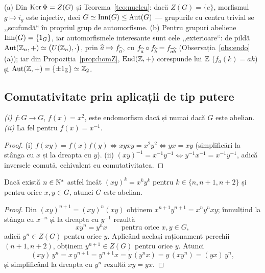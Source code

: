 \begin{observatie}
(a) Din $\operatorname{Ker}\Phi=Z(G)$ și Teorema~\ref{teo:nucleu}: dacă $Z(G)=\{e\}$, morfismul $g\mapsto i_g$ este injectiv, deci $G\simeq\operatorname{Inn}(G)\le\operatorname{Aut}(G)$ --- grupurile cu centru trivial se ,,scufundă`` în propriul grup de automorfisme. (b) Pentru grupuri abeliene $\operatorname{Inn}(G)=\{1_G\}$, iar automorfismele interesante sunt cele ,,exterioare``: de pildă $\operatorname{Aut}(\mathbb{Z}_n,+)\simeq\bigl(U(\mathbb{Z}_n),\cdot\bigr)$, prin $\widehat{a}\mapsto f_{\widehat{a}}$, cu $f_{\widehat{a}}\circ f_{\widehat{b}}=f_{\widehat{a}\widehat{b}}$ (Observația~\ref{obs:endo}(a)); iar din Propoziția~\ref{prop:homZ}, $\operatorname{End}(\mathbb{Z},+)$ corespunde lui $\mathbb{Z}$ ($f_a(k)=ak$) și $\operatorname{Aut}(\mathbb{Z},+)=\{\pm1_{\mathbb{Z}}\}\simeq\mathbb{Z}_2$.
\end{observatie}

\subsection*{Comutativitate prin aplicații de tip putere}

\begin{propozitie}\label{prop:patrat}
\emph{(i)} $f:G\to G$, $f(x)=x^2$, este endomorfism dacă și numai dacă $G$ este abelian. \emph{(ii)} La fel pentru $f(x)=x^{-1}$.
\end{propozitie}

\begin{proof}
(i) $f(xy)=f(x)f(y)\iff xyxy=x^2y^2\iff yx=xy$ (simplificări la stânga cu $x$ și la dreapta cu $y$). (ii) $(xy)^{-1}=x^{-1}y^{-1}\iff y^{-1}x^{-1}=x^{-1}y^{-1}$, adică inversele comută, echivalent cu comutativitatea.
\end{proof}

\begin{teorema}\label{teo:consec}
Dacă există $n\in\mathbb{N}^*$ astfel încât $(xy)^k=x^k y^k$ pentru $k\in\{n,n+1,n+2\}$ și pentru orice $x,y\in G$, atunci $G$ este abelian.
\end{teorema}

\begin{proof}
Din $(xy)^{n+1}=(xy)^n(xy)$ obținem $x^{n+1}y^{n+1}=x^ny^nxy$; înmulțind la stânga cu $x^{-n}$ și la dreapta cu $y^{-1}$ rezultă
\[
xy^n=y^nx\qquad\text{pentru orice }x,y\in G,
\]
adică $y^n\in Z(G)$ pentru orice $y$. Aplicând același raționament perechii $(n+1,n+2)$, obținem $y^{n+1}\in Z(G)$ pentru orice $y$. Atunci
\[
(xy)\,y^n=x\,y^{n+1}=y^{n+1}x=y\,(y^n x)=y\,(x y^n)=(yx)\,y^n,
\]
și simplificând la dreapta cu $y^n$ rezultă $xy=yx$.
\end{proof}

